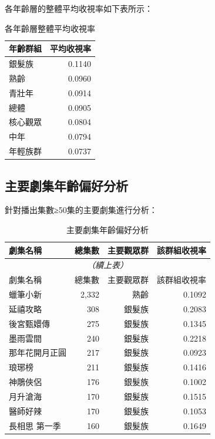 \documentclass[12pt,a4paper]{article}
\begin{document}
各年齡層的整體平均收視率如下表所示：

\begin{table}[H]
\centering
\caption{各年齡層整體平均收視率}
\begin{tabular}{lr}
\toprule
年齡群組 & 平均收視率 \\
\midrule
銀髮族 & 0.1140 \\
熟齡 & 0.0960 \\
青壯年 & 0.0914 \\
總體 & 0.0905 \\
核心觀眾 & 0.0804 \\
中年 & 0.0794 \\
年輕族群 & 0.0737 \\

\bottomrule
\end{tabular}
\end{table}

\subsection{主要劇集年齡偏好分析}

針對播出集數≥50集的主要劇集進行分析：

\begin{longtable}{lrrr}
\caption{主要劇集年齡偏好分析} \\
\toprule
劇集名稱 & 總集數 & 主要觀眾群 & 該群組收視率 \\
\midrule
\endfirsthead
\multicolumn{4}{c}{\textit{（續上表）}} \\
\toprule
劇集名稱 & 總集數 & 主要觀眾群 & 該群組收視率 \\
\midrule
\endhead
\bottomrule
\endfoot
蠟筆小新 & 2,332 & 熟齡 & 0.1092 \\
延禧攻略 & 308 & 銀髮族 & 0.2083 \\
後宮甄嬛傳 & 275 & 銀髮族 & 0.1345 \\
墨雨雲間 & 240 & 銀髮族 & 0.2218 \\
那年花開月正圓 & 217 & 銀髮族 & 0.0923 \\
琅琊榜 & 211 & 銀髮族 & 0.1416 \\
神鵰俠侶 & 176 & 銀髮族 & 0.1002 \\
月升滄海 & 170 & 銀髮族 & 0.1515 \\
醫師好辣 & 170 & 銀髮族 & 0.1053 \\
長相思 第一季 & 160 & 銀髮族 & 0.1649 \\

\end{longtable}
\end{document}
